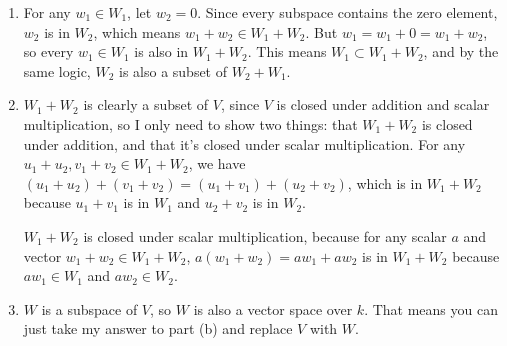 \documentclass{article}
\begin{document}
\bigskip
\begin{prob}
\end{prob}
\begin{enumerate}[label=(\alph*)]
    \item For any $w_1 \in W_1$, let $w_2=0$. Since every subspace contains the zero element, $w_2$ is in $W_2$, which means $w_1 + w_2 \in W_1 + W_2$. But $w_1 = w_1+0=w_1+w_2$, so every $w_1 \in W_1$ is also in $W_1+W_2$. This means $W_1 \subset W_1+W_2$, and by the same logic, $W_2$ is also a subset of $W_2+W_1$.
    \item $W_1+W_2$ is clearly a subset of $V$, since $V$ is closed under addition and scalar multiplication, so I only need to show two things: that $W_1+W_2$ is closed under addition, and that it's closed under scalar multiplication. For any $u_1+u_2, v_1+v_2 \in W_1+W_2$, we have $(u_1+u_2)+(v_1+v_2) = (u_1+v_1)+(u_2+v_2)$, which is in $W_1+W_2$ because $u_1+v_1$ is in $W_1$ and $u_2+v_2$ is in $W_2$.
        \par
        $W_1+W_2$ is closed under scalar multiplication, because for any scalar $a$ and vector $w_1+w_2 \in W_1+W_2$, $a(w_1+w_2)=aw_1+aw_2$ is in $W_1+W_2$ because $aw_1 \in W_1$ and $aw_2 \in W_2$.
    \item $W$ is a subspace of $V$, so $W$ is also a vector space over $k$. That means you can just take my answer to part (b) and replace $V$ with $W$.
\end{enumerate}
\end{document}
